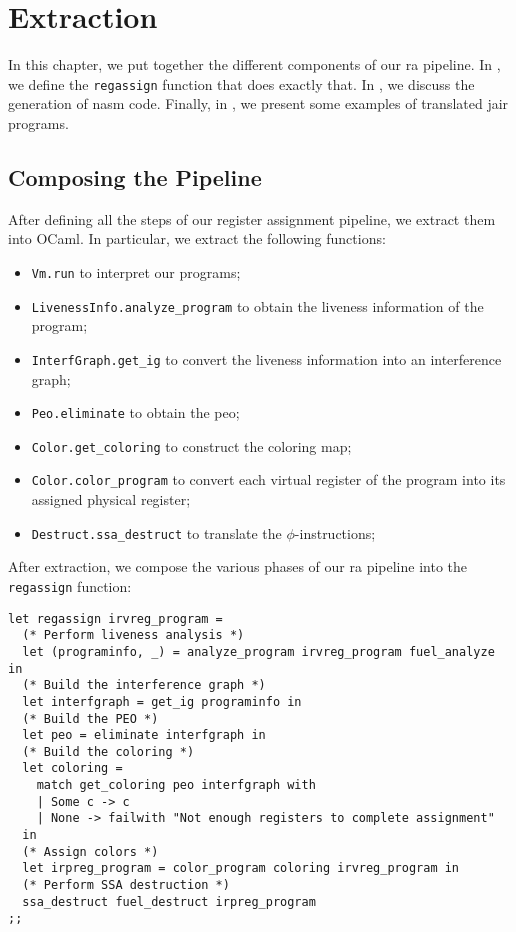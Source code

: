 
\chapter{Extraction}
\label{cha:extraction}

In this chapter, we put together the different components of our \gls{ra} pipeline. In , we define the \texttt{regassign} function that does exactly that. In , we discuss the generation of \gls{nasm} code. Finally, in , we present some examples of translated \gls{jair} programs.

\section{Composing the Pipeline}
\label{sec:pipeline}

After defining all the steps of our register assignment pipeline, we extract them into OCaml.
In particular, we extract the following functions:
\begin{itemize}
  \item \texttt{Vm.run} to interpret our programs;
  \item \texttt{LivenessInfo.analyze\_program} to obtain the liveness information of the program;
  \item \texttt{InterfGraph.get\_ig} to convert the liveness information into an interference graph;
  \item \texttt{Peo.eliminate} to obtain the \gls{peo};
  \item \texttt{Color.get\_coloring} to construct the coloring map;
  \item \texttt{Color.color\_program} to convert each virtual register of the program into its assigned physical register;
  \item \texttt{Destruct.ssa\_destruct} to translate the $\phi$-instructions;
\end{itemize}

After extraction, we compose the various phases of our \gls{ra} pipeline into the \texttt{regassign} function:

\begin{lstlisting}[style=OCaml]
let regassign irvreg_program =
  (* Perform liveness analysis *)
  let (programinfo, _) = analyze_program irvreg_program fuel_analyze in
  (* Build the interference graph *)
  let interfgraph = get_ig programinfo in
  (* Build the PEO *)
  let peo = eliminate interfgraph in
  (* Build the coloring *)
  let coloring =
    match get_coloring peo interfgraph with
    | Some c -> c
    | None -> failwith "Not enough registers to complete assignment"
  in
  (* Assign colors *)
  let irpreg_program = color_program coloring irvreg_program in
  (* Perform SSA destruction *)
  ssa_destruct fuel_destruct irpreg_program
;;
\end{lstlisting}

